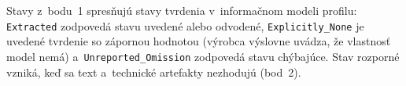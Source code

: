 Stavy z~bodu~1 spresňujú stavy tvrdenia v~informačnom modeli profilu:
\texttt{Extracted} zodpovedá stavu uvedené alebo odvodené,
\texttt{Explicitly\_None} je uvedené tvrdenie so zápornou hodnotou (výrobca
výslovne uvádza, že vlastnosť model nemá) a~\texttt{Unreported\_Omission}
zodpovedá stavu chýbajúce. Stav rozporné vzniká, keď sa text a~technické
artefakty nezhodujú (bod~2).
